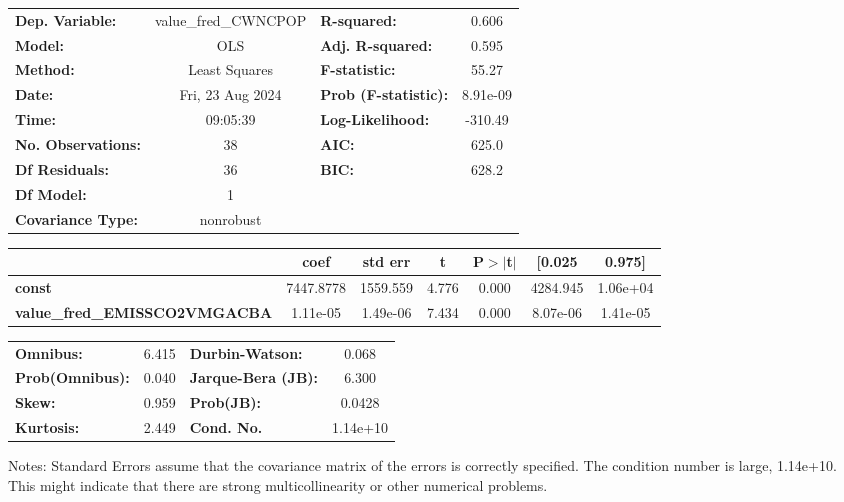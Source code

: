 \begin{center}
\begin{tabular}{lclc}
\toprule
\textbf{Dep. Variable:}               & value\_fred\_CWNCPOP & \textbf{  R-squared:         } &     0.606   \\
\textbf{Model:}                       &         OLS          & \textbf{  Adj. R-squared:    } &     0.595   \\
\textbf{Method:}                      &    Least Squares     & \textbf{  F-statistic:       } &     55.27   \\
\textbf{Date:}                        &   Fri, 23 Aug 2024   & \textbf{  Prob (F-statistic):} &  8.91e-09   \\
\textbf{Time:}                        &       09:05:39       & \textbf{  Log-Likelihood:    } &   -310.49   \\
\textbf{No. Observations:}            &            38        & \textbf{  AIC:               } &     625.0   \\
\textbf{Df Residuals:}                &            36        & \textbf{  BIC:               } &     628.2   \\
\textbf{Df Model:}                    &             1        & \textbf{                     } &             \\
\textbf{Covariance Type:}             &      nonrobust       & \textbf{                     } &             \\
\bottomrule
\end{tabular}

\begin{tabular}{lcccccc}
                                      & \textbf{coef} & \textbf{std err} & \textbf{t} & \textbf{P$> |$t$|$} & \textbf{[0.025} & \textbf{0.975]}  \\
\midrule
\textbf{const}                        &    7447.8778  &     1559.559     &     4.776  &         0.000        &     4284.945    &     1.06e+04     \\
\textbf{value\_fred\_EMISSCO2VMGACBA} &     1.11e-05  &     1.49e-06     &     7.434  &         0.000        &     8.07e-06    &     1.41e-05     \\
\bottomrule
\end{tabular}

\begin{tabular}{lclc}
\textbf{Omnibus:}       &  6.415 & \textbf{  Durbin-Watson:     } &    0.068  \\
\textbf{Prob(Omnibus):} &  0.040 & \textbf{  Jarque-Bera (JB):  } &    6.300  \\
\textbf{Skew:}          &  0.959 & \textbf{  Prob(JB):          } &   0.0428  \\
\textbf{Kurtosis:}      &  2.449 & \textbf{  Cond. No.          } & 1.14e+10  \\
\bottomrule
\end{tabular}
\end{center}

Notes: \newline
 [1] Standard Errors assume that the covariance matrix of the errors is correctly specified. \newline
 [2] The condition number is large, 1.14e+10. This might indicate that there are \newline
 strong multicollinearity or other numerical problems.